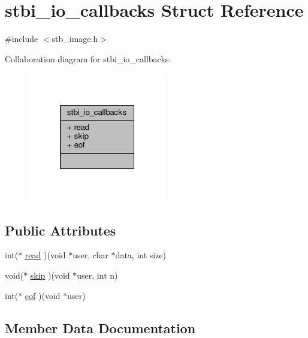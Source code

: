 \hypertarget{structstbi__io__callbacks}{}\section{stbi\+\_\+io\+\_\+callbacks Struct Reference}
\label{structstbi__io__callbacks}


{\ttfamily \#include $<$stb\+\_\+image.\+h$>$}



Collaboration diagram for stbi\+\_\+io\+\_\+callbacks\+:
\nopagebreak
\begin{figure}[H]
\begin{center}
\leavevmode
\includegraphics[width=172pt]{structstbi__io__callbacks__coll__graph}
\end{center}
\end{figure}
\subsection*{Public Attributes}
\begin{DoxyCompactItemize}
\item 
int($\ast$ \hyperlink{structstbi__io__callbacks_a623e46b3a2a019611601409926283a88}{read} )(void $\ast$user, char $\ast$data, int size)
\item 
void($\ast$ \hyperlink{structstbi__io__callbacks_a257aac5480a90a6c4b8fbe86c1b01068}{skip} )(void $\ast$user, int n)
\item 
int($\ast$ \hyperlink{structstbi__io__callbacks_a319639db2f76e715eed7a7a974136832}{eof} )(void $\ast$user)
\end{DoxyCompactItemize}


\subsection{Member Data Documentation}
\mbox{\label{structstbi__io__callbacks_a319639db2f76e715eed7a7a974136832}} 
